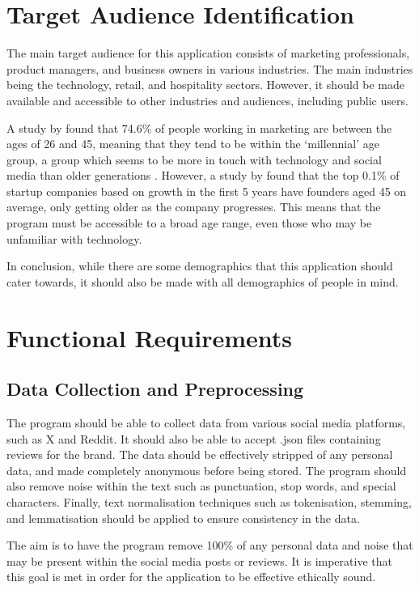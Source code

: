 \section{Target Audience Identification}
The main target audience for this application consists of marketing professionals, product managers, and business owners in various industries. The main industries being the technology, retail, and hospitality sectors. However, it should be made available and accessible to other industries and audiences, including public users.

A study by \citet{marketing2023survey} found that 74.6\% of people working in marketing are between the ages of 26 and 45, meaning that they tend to be within the `millennial' age group, a group which seems to be more in touch with technology and social media than older generations \citep{pew2019millennials}. However, a study by \citet{harvard2018research} found that the top 0.1\% of startup companies based on growth in the first 5 years have founders aged 45 on average, only getting older as the company progresses. This means that the program must be accessible to a broad age range, even those who may be unfamiliar with technology.

In conclusion, while there are some demographics that this application should cater towards, it should also be made with all demographics of people in mind.

\section{Functional Requirements}

    \subsection{Data Collection and Preprocessing}
    The program should be able to collect data from various social media platforms, such as X and Reddit. It should also be able to accept .json files containing reviews for the brand. The data should be effectively stripped of any personal data, and made completely anonymous before being stored. The program should also remove noise within the text such as punctuation, stop words, and special characters. Finally, text normalisation techniques such as tokenisation, stemming, and lemmatisation should be applied to ensure consistency in the data.

    The aim is to have the program remove 100\% of any personal data and noise that may be present within the social media posts or reviews. It is imperative that this goal is met in order for the application to be effective ethically sound.

